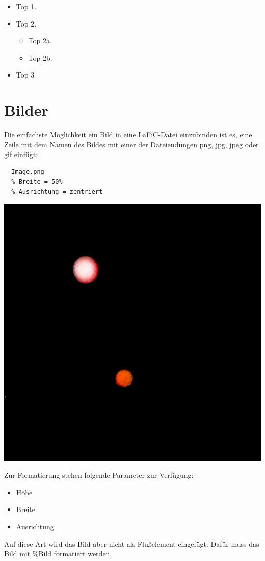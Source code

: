 \documentclass{scrartcl}
\begin{document}
\begin{itemize}
\item Top 1.
\item Top 2.
\begin{itemize}
\item Top 2a.
\item Top 2b.
\end{itemize}
\item Top 3
\end{itemize}


\section{Bilder}

{Die einfachste Möglichkeit ein Bild in eine LaFiC-Datei
einzubinden ist es, eine Zeile mit dem Namen des Bildes mit
einer der Dateiendungen png, jpg, jpeg oder gif einfügt:\\}

\begin{verbatim}
  Image.png
  % Breite = 50%
  % Ausrichtung = zentriert
\end{verbatim}


{\centering\includegraphics[width=.50\linewidth]{Image.png}\\}

{Zur Formatierung stehen folgende Parameter zur Verfügung:\\}

\begin{itemize}
\item Höhe
\item Breite
\item Ausrichtung
\end{itemize}


{Auf diese Art wird das Bild aber nicht als Flußelement
eingefügt. Dafür muss das Bild mit  \%Bild formatiert
werden.\\}
\end{document}

